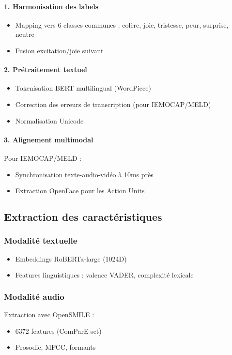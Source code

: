 \documentclass[a4paper,11pt]{article}
\begin{document}
\paragraph{1. Harmonisation des labels}
\begin{itemize}
    \item Mapping vers 6 classes communes : colère, joie, tristesse, peur, surprise, neutre
    \item Fusion excitation/joie suivant \cite{zhang2023survey}
\end{itemize}

\paragraph{2. Prétraitement textuel}
\begin{itemize}
    \item Tokenisation BERT multilingual (WordPiece)
    \item Correction des erreurs de transcription (pour IEMOCAP/MELD)
    \item Normalisation Unicode
\end{itemize}

\paragraph{3. Alignement multimodal}
Pour IEMOCAP/MELD :
\begin{itemize}
    \item Synchronisation texte-audio-vidéo à 10ms près
    \item Extraction OpenFace pour les Action Units
\end{itemize}

\subsection{Extraction des caractéristiques}
\subsubsection{Modalité textuelle}
\begin{itemize}
    \item Embeddings RoBERTa-large (1024D)
    \item Features linguistiques : valence VADER, complexité lexicale
\end{itemize}

\subsubsection{Modalité audio}
Extraction avec OpenSMILE :
\begin{itemize}
    \item 6372 features (ComParE set)
    \item Prosodie, MFCC, formants
\end{itemize}
\end{document}
